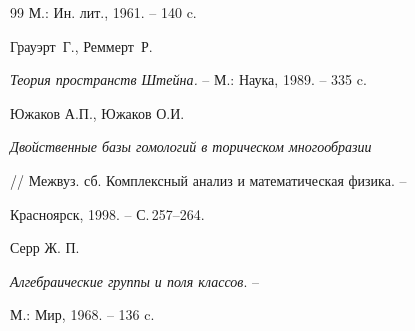 \begin{thebibliography}{99}
М.: Ин. лит., 1961. -- 140 c.




Грауэрт~Г., Реммерт~Р.


{\it Теория пространств Штейна.} -- М.: Наука, 1989. -- 335 c.




Южаков А.П., Южаков О.И.


{\it Двойственные базы гомологий в торическом многообразии}


// Межвуз. сб. Комплексный анализ и математическая физика. --


Красноярск, 1998. -- С.\,257--264.




Серр Ж. П.


{\it Алгебраические группы и поля классов}. --


М.: Мир, 1968. -- 136 c.





\end{thebibliography}





\vskip 2cm












\label{end}





